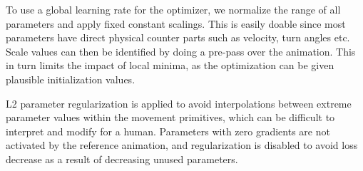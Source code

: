 To use a global learning rate for the optimizer, we normalize the range of all parameters and apply fixed constant scalings. This is easily doable since most parameters have direct physical counter parts such as velocity, turn angles etc. Scale values can then be identified by doing a pre-pass over the animation. This in turn limits the impact of local minima, as the optimization can be given plausible initialization values.

L2 parameter regularization is applied to avoid interpolations between extreme parameter values within the movement primitives, which can be difficult to interpret and modify for a human. Parameters with zero gradients are not activated by the reference animation, and regularization is disabled to avoid loss decrease as a result of decreasing unused parameters.

